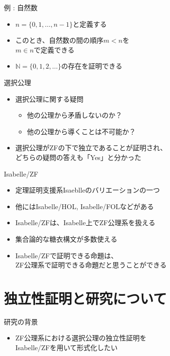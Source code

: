 \documentclass[17pt,aspectratio=169]{beamer}
\begin{document}
\begin{frame} {例 : 自然数}
    \begin{itemize}
        \item $n = \{0, 1, \dots, n-1\}$と定義する
        \item このとき、自然数の間の順序$m < n$を\\$m \in n$で定義できる
        \item $\mathbb{N} = \{ 0, 1, 2, \dots \}$の存在を証明できる
    \end{itemize}
\end{frame}

\begin{frame} {選択公理}
    \begin{itemize}
        \item 選択公理に関する疑問
              \begin{itemize}
                  \item 他の公理から矛盾しないのか？
                  \item 他の公理から導くことは不可能か？
              \end{itemize}
        \item 選択公理がZFの下で独立であることが証明され、\\
              どちらの疑問の答えも「Yes」と分かった
    \end{itemize}
\end{frame}

\begin{frame} {Isabelle/ZF}
    \begin{itemize}
        \item 定理証明支援系Isaeblleのバリエーションの一つ
        \item 他にはIsabelle/HOL, Isabelle/FOLなどがある
        \item Isabelle/ZFは、Isabelle上でZF公理系を扱える
        \item 集合論的な糖衣構文が多数使える
        \item Isabelle/ZFで証明できる命題は、\\
              ZF公理系で証明できる命題だと思うことができる
    \end{itemize}
\end{frame}

\section{独立性証明と研究について}

\begin{frame} {研究の背景}
    \begin{itemize}
        \item ZF公理系における選択公理の独立性証明を\\Isabelle/ZFを用いて形式化したい
    \end{itemize}
\end{frame}
\end{document}
